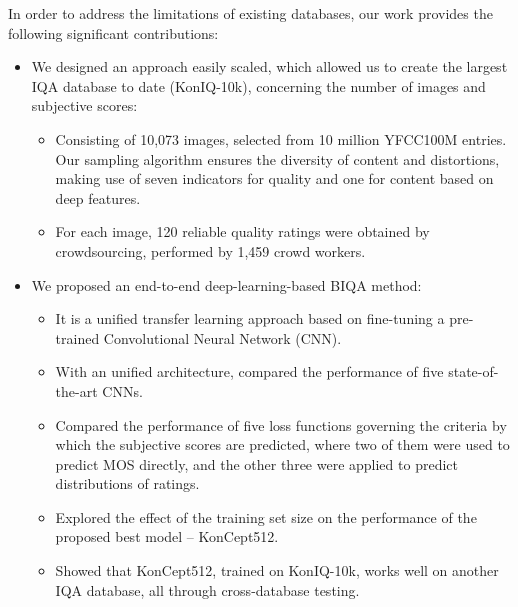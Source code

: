 \documentclass[10pt,journal,compsoc]{IEEEtran}
\begin{document}
In order to address the limitations of existing databases, our work provides the following significant contributions:
\begin{itemize}[leftmargin=*]
\item We designed an approach easily scaled, which allowed us to create the largest IQA database to date (KonIQ-10k), concerning the number of images and subjective scores:
    \begin{itemize}[leftmargin=*]
    \item Consisting of 10,073 images, selected from 10 million YFCC100M \cite{thomee:2016} entries. Our sampling algorithm ensures the diversity of content and distortions, making use of seven indicators for quality and one for content based on deep features.
    \item For each image, 120 reliable quality ratings were obtained by crowdsourcing, performed by 1,459 crowd workers.
    \end{itemize}  \item We proposed an end-to-end deep-learning-based BIQA method:
    \begin{itemize}[leftmargin=*]
    \item It is a unified transfer learning approach based on fine-tuning a pre-trained  Convolutional Neural Network (CNN).
    \item With an unified architecture, compared the performance of five state-of-the-art CNNs.\item Compared the performance of five loss functions governing the criteria by which the subjective scores are predicted, where two of them were used to predict MOS directly, and the other three were applied to predict distributions of ratings.\item Explored the effect of the training set size on the performance of the proposed best model -- KonCept512.
    \item Showed that KonCept512, trained on KonIQ-10k, works well on another IQA database, all through cross-database testing.
    \end{itemize}
\end{itemize} 
\end{document}
